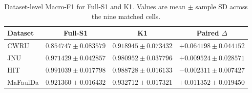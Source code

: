 \begin{table}[t]
\centering
\caption{Dataset-level Macro-F1 for Full-S1 and K1. Values are mean $\pm$ sample SD across the nine matched cells.}
\label{tab:dataset_results}
\small
\begin{tabular}{lccc}
\toprule
Dataset & Full-S1 & K1 & Paired $\Delta$ \\
\midrule
CWRU & $0.854747 \pm 0.083579$ & $0.918945 \pm 0.073432$ & $+0.064198 \pm 0.044152$ \\
JNU & $0.971429 \pm 0.042857$ & $0.980952 \pm 0.037796$ & $+0.009524 \pm 0.028571$ \\
HIT & $0.991039 \pm 0.017798$ & $0.988728 \pm 0.016133$ & $-0.002311 \pm 0.007427$ \\
MaFaulDa & $0.921360 \pm 0.016432$ & $0.932712 \pm 0.017321$ & $+0.011352 \pm 0.019450$ \\
\bottomrule
\end{tabular}
\end{table}
